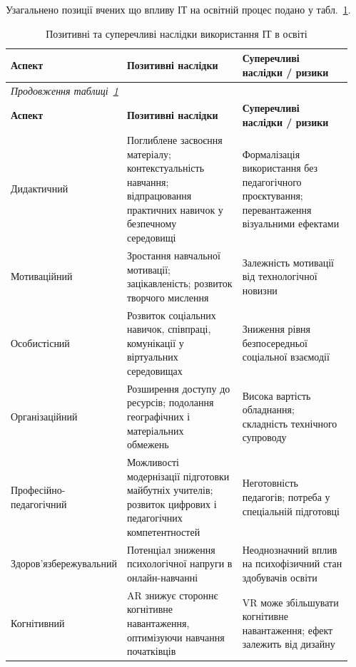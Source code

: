 Узагальнено позиції вчених що впливу ІТ на освітній процес подано у табл.~\ref{tab:iot_effects}.

{\small
\begin{longtable}{|p{0.18\linewidth}|p{0.39\linewidth}|p{0.38\linewidth}|}
\caption{Позитивні та суперечливі наслідки використання ІТ в освіті}\label{tab:iot_effects}\\
\hline
\hfil \textbf{Аспект} & \hfil \textbf{Позитивні наслідки} & \hfil \textbf{Суперечливі наслідки / ризики} \\
\hline
\endfirsthead
\multicolumn{3}{l}{\textit{Продовження таблиці~\ref{tab:iot_effects}}}\\
\hline
\hfil \textbf{Аспект} & \hfil \textbf{Позитивні наслідки} & \hfil \textbf{Суперечливі наслідки / ризики} \\
\hline
\endhead
\endfoot
Дидактичний & Поглиблене засвоєння матеріалу; контекстуальність навчання; відпрацювання практичних навичок у безпечному середовищі~\cite{Radianti2020VR, Dalgarno2010What} & Формалізація використання без педагогічного проєктування; перевантаження візуальними ефектами \\
\hline
Мотиваційний & Зростання навчальної мотивації; зацікавленість; розвиток творчого мислення~\cite{Angelov2025Synergy, KMotivation2023} & Залежність мотивації від технологічної новизни \\
\hline
Особистісний & Розвиток соціальних навичок, співпраці, комунікації у віртуальних середовищах~\cite{DiNatale2020Immersive} & Зниження рівня безпосередньої соціальної взаємодії \\
\hline
Організаційний & Розширення доступу до ресурсів; подолання географічних і матеріальних обмежень~\cite{Radianti2020VR} & Висока вартість обладнання; складність технічного супроводу \\
\hline
Професійно-педагогічний & Можливості модернізації підготовки майбутніх учителів; розвиток цифрових і педагогічних компетентностей~\cite{Angelov2025Synergy} & Неготовність педагогів; потреба у спеціальній підготовці \\
\hline
Здоров'язбе\-режувальний & Потенціал зниження психологічної напруги в онлайн-навчанні~\cite{Krokos2019Virtual} & Неоднозначний вплив на психофізичний стан здобувачів освіти~\cite{Parong2021Cognitive} \\
\hline
Когнітивний & AR знижує стороннє когнітивне навантаження, оптимізуючи навчання початківців~\cite{Poupard2024Systematic, Buchner2021CogLoad} & VR може збільшувати когнітивне навантаження; ефект залежить від дизайну~\cite{Parong2021Cognitive, Mulders2020Framework} \\
\hline
\end{longtable}
}

